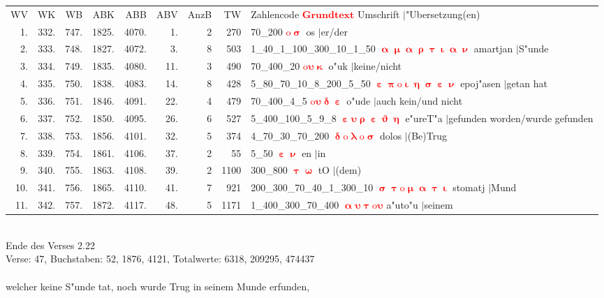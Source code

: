 \documentclass[a4paper,10pt,landscape]{article}
\begin{document}
\begin{tabular}{rrrrrrrrp{120mm}}
WV&WK&WB&ABK&ABB&ABV&AnzB&TW&Zahlencode \textcolor{red}{$\boldsymbol{Grundtext}$} Umschrift $|$"Ubersetzung(en)\\
1.&332.&747.&1825.&4070.&1.&2&270&70\_200 \textcolor{red}{$\boldsymbol{\mathrm{o}\upsigma}$} os $|$er/der\\
2.&333.&748.&1827.&4072.&3.&8&503&1\_40\_1\_100\_300\_10\_1\_50 \textcolor{red}{$\boldsymbol{\upalpha\upmu\upalpha\uprho\uptau\upiota\upalpha\upnu}$} amartjan $|$S"unde\\
3.&334.&749.&1835.&4080.&11.&3&490&70\_400\_20 \textcolor{red}{$\boldsymbol{\mathrm{o}\upsilon\upkappa}$} o"uk $|$keine/nicht\\
4.&335.&750.&1838.&4083.&14.&8&428&5\_80\_70\_10\_8\_200\_5\_50 \textcolor{red}{$\boldsymbol{\upepsilon\uppi\mathrm{o}\upiota\upeta\upsigma\upepsilon\upnu}$} epoj"asen $|$getan hat\\
5.&336.&751.&1846.&4091.&22.&4&479&70\_400\_4\_5 \textcolor{red}{$\boldsymbol{\mathrm{o}\upsilon\updelta\upepsilon}$} o"ude $|$auch kein/und nicht\\
6.&337.&752.&1850.&4095.&26.&6&527&5\_400\_100\_5\_9\_8 \textcolor{red}{$\boldsymbol{\upepsilon\upsilon\uprho\upepsilon\upvartheta\upeta}$} e"ureT"a $|$gefunden worden/wurde gefunden\\
7.&338.&753.&1856.&4101.&32.&5&374&4\_70\_30\_70\_200 \textcolor{red}{$\boldsymbol{\updelta\mathrm{o}\uplambda\mathrm{o}\upsigma}$} dolos $|$(Be)Trug\\
8.&339.&754.&1861.&4106.&37.&2&55&5\_50 \textcolor{red}{$\boldsymbol{\upepsilon\upnu}$} en $|$in\\
9.&340.&755.&1863.&4108.&39.&2&1100&300\_800 \textcolor{red}{$\boldsymbol{\uptau\upomega}$} tO $|$(dem)\\
10.&341.&756.&1865.&4110.&41.&7&921&200\_300\_70\_40\_1\_300\_10 \textcolor{red}{$\boldsymbol{\upsigma\uptau\mathrm{o}\upmu\upalpha\uptau\upiota}$} stomatj $|$Mund\\
11.&342.&757.&1872.&4117.&48.&5&1171&1\_400\_300\_70\_400 \textcolor{red}{$\boldsymbol{\upalpha\upsilon\uptau\mathrm{o}\upsilon}$} a"uto"u $|$seinem\\
\end{tabular}\medskip \\
Ende des Verses 2.22\\
Verse: 47, Buchstaben: 52, 1876, 4121, Totalwerte: 6318, 209295, 474437\\
\\
welcher keine S"unde tat, noch wurde Trug in seinem Munde erfunden,\\
\end{document}
